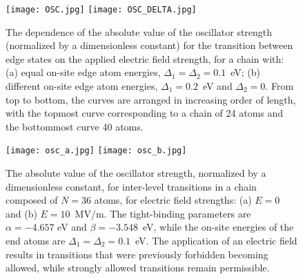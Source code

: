 \documentclass[
preprint,
 amsmath,amssymb,
 aps,
]{revtex4-2}
\begin{document}

\begin{figure}
\texttt{[image: OSC.jpg]}
\texttt{[image: OSC\_DELTA.jpg]}
    \caption{The dependence of the absolute value of the oscillator strength (normalized by a dimensionless constant) for the transition between edge states on the applied electric field strength, for a chain with: (a) equal on-site edge atom energies, $\Delta_1=\Delta_2=0.1$~eV; (b) different on-site edge atom energies, $\Delta_1=0.2$~eV and $\Delta_2=0$. From top to bottom, the curves are arranged in increasing order of length, with the topmost curve corresponding to a chain of 24 atoms and the bottommost curve 40 atoms. 
}
    \label{fig:osc}
\end{figure}
\begin{figure}
\texttt{[image: osc\_a.jpg]}
\texttt{[image: osc\_b.jpg]}
\caption{The absolute value of the oscillator strength, normalized by a dimensionless constant, for inter-level transitions in a chain composed of $N = 36$ atoms, for electric field strengths: (a) $E = 0$ and (b) $E = 10$~MV/m. The tight-binding parameters are $\alpha = -4.657$ eV and $\beta = -3.548$~eV, while the on-site energies of the end atoms are $\Delta_1 = \Delta_2 = 0.1$~eV. The application of an electric field results in transitions that were previously forbidden becoming allowed, while strongly allowed transitions remain permissible.
}
\label{fig:osc_matrix}
\end{figure}
\end{document}
